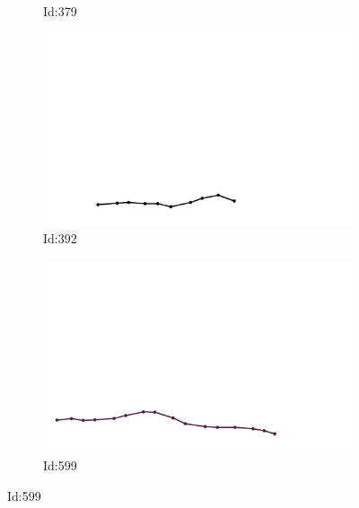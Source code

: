 \documentclass[12pt,twoside]{report}
\begin{document}
\begin{figure}
\begin{subfigure}[b]{0.20\textwidth}
\caption{Id:379}
\end{subfigure}
\begin{subfigure}[b]{0.20\textwidth}
\centering
\includegraphics[width=\textwidth]{../../trajectories/392.png}
\caption{Id:392}
\end{subfigure}
\begin{subfigure}[b]{0.20\textwidth}
\centering
\includegraphics[width=\textwidth]{../../trajectories/599.png}
\caption{Id:599}
\end{subfigure}
\end{figure}
\end{document}
